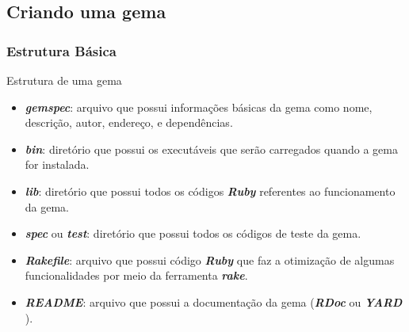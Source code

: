 \subsection{Criando uma gema}
\begin{frame}
\frametitle{Estrutura Básica}

  \begin{block}{Estrutura de uma gema}

   \begin{itemize}

    \item \emph{\textbf{gemspec}}: arquivo que possui informações básicas da gema como nome, descrição,
    autor, endereço, e dependências.

    \item \emph{\textbf{bin}}: diretório que possui os executáveis que serão carregados quando a gema for
    instalada.

    \item \emph{\textbf{lib}}: diretório que possui todos os códigos \emph{\textbf{Ruby}} referentes ao
    funcionamento da gema.

    \item \emph{\textbf{spec}} ou \emph{\textbf{test}}: diretório que possui todos os códigos de teste da gema.

    \item \emph{\textbf{Rakefile}}: arquivo que possui código \emph{\textbf{Ruby}} que faz a otimização de
    algumas funcionalidades por meio da ferramenta \emph{\textbf{rake}}.

    \item \emph{\textbf{README}}: arquivo que possui a documentação da gema (\emph{\textbf{RDoc}} ou
    \emph{\textbf{YARD}} ).

   \end{itemize}

  \end{block}

\end{frame}


